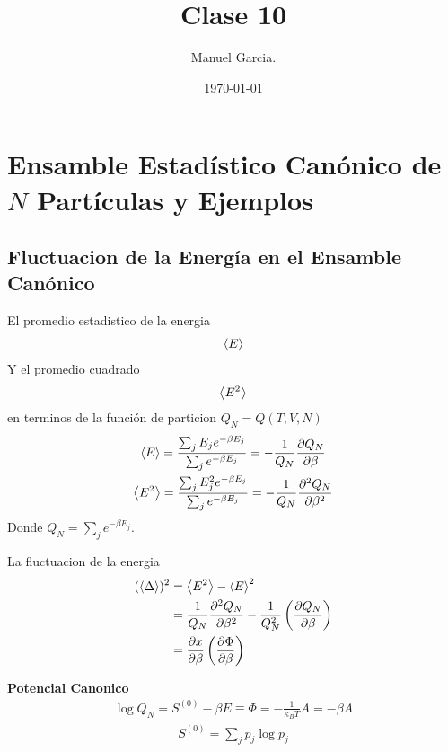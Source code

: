 \documentclass{article}
\title{Clase 10 }
\author{Manuel Garcia.}
\date{\today}
\begin{document}
\maketitle

\section{Ensamble Estadístico Canónico de $ N  $ Partículas y Ejemplos}
\subsection{Fluctuacion de la Energía en el Ensamble Canónico }
El promedio estadistico de la energia 
\begin{gather*}
  \expval{E }
\end{gather*}
Y el promedio cuadrado 
\begin{gather*}
  \expval{E^2 } 
\end{gather*}
en terminos de la función de particion $ Q_N = Q(T,V,N ) $
\begin{gather*}
  \expval{E } = \frac{\sum_{j }^{} E_j e ^ {- \beta E_j }}{\sum_{j }^{} e ^ {- \beta E_j }} = - \frac{1}{Q_N } \frac{\partial Q_N  }{\partial \beta} \\
  \expval{E^2 } = \frac{\sum_{j }^{} E_j^2 e ^ {- \beta E_j }}{\sum_{j }^{} e ^ {- \beta E_j }} = - \frac{1}{Q_N } \frac{\partial^2 Q_N  }{\partial \beta^2 }
\end{gather*}
Donde $ Q_N = \sum_{j }^{} e ^ {-\beta E_j } $.

La fluctuacion de la energia 
\begin{align*}
  (\expval{\Delta })^2 &= \expval{E^2 } - \expval{E }^2 \\
  &= \frac{1}{Q_N } \frac{\partial ^2 Q_N  }{\partial \beta^2 } - \frac{1}{Q_N^2 } \left(\frac{\partial  Q_N  }{\partial \beta }\right) \\
  &= \frac{\partial x }{\partial \beta} \left(\frac{\partial \Phi  }{\partial \beta}\right) 
\end{align*}

\textbf{Potencial Canonico }
\begin{gather*}
  \log{Q_N } = S ^ {(0) } - \beta E \equiv \Phi = - \frac{1}{\kappa_B T }A = - \beta A 
\end{gather*}
\begin{gather*}
  S ^ {(0)} = \sum_{j }^{} p_j \log{p_j} 
\end{gather*}
\end{document}
